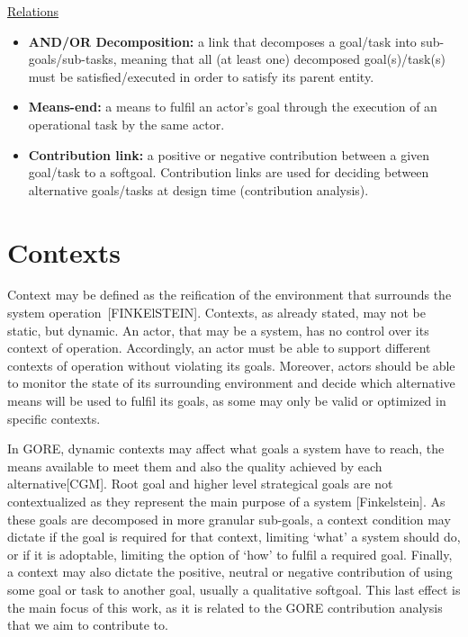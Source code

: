 \large{\underline{Relations}}

\begin{itemize}

\item \textbf{AND/OR Decomposition:} a link that decomposes a goal/task into sub-goals/sub-tasks, meaning that all (at least one) decomposed goal(s)/task(s) must be satisfied/executed in order to satisfy its parent entity. 
\medskip

\item \textbf{Means-end:} a means to fulfil an actor's goal through the execution of an operational task by the same actor.
\medskip

\item \textbf{Contribution link:} a positive or negative contribution between a given goal/task to a softgoal. Contribution links are used for deciding between alternative goals/tasks at design time (contribution analysis).

\end{itemize}

\section{Contexts}

Context may be defined as the reification of the environment that surrounds the system operation~[FINKElSTEIN]. Contexts, as already stated, may not be static, but dynamic. An actor, that may be a system, has no control over its context of operation. Accordingly, an actor must be able to support different contexts of operation without violating its goals. Moreover, actors should be able to monitor the state of its surrounding environment and decide which alternative means will be used to fulfil its goals, as some may only be valid or optimized in specific contexts.

In GORE, dynamic contexts may affect what goals a system have to reach, the means available to meet them and also the quality achieved by each alternative[CGM]. Root goal and higher level strategical goals are not contextualized as they represent the main purpose of a system [Finkelstein]. As these goals are decomposed in more granular sub-goals, a context condition may dictate if the goal is required for that context, limiting `what' a system should do, or if it is adoptable, limiting the option of `how' to fulfil a required goal. Finally, a context may also dictate the positive, neutral or negative contribution of using some goal or task to another goal, usually a qualitative softgoal. This last effect is the main focus of this work, as it is related to the GORE contribution analysis that we aim to contribute to.
 

